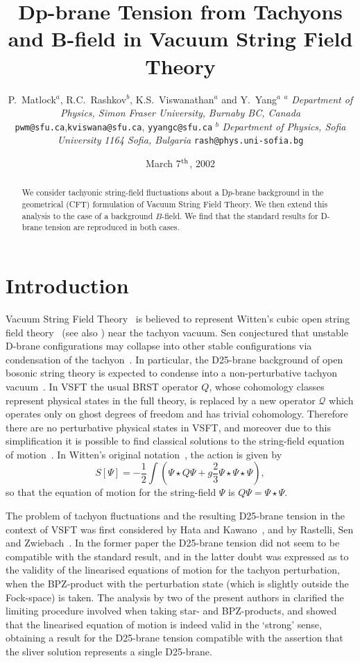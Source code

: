 \documentclass[letterpaper,12pt]{article}
\title{Dp-brane Tension from Tachyons and B-field in Vacuum String Field Theory}
\author{P.~Matlock$^a$, R.C.~Rashkov$^b$, K.S.~Viswanathan$^a$ and Y.~Yang$^a$ \cr\cr
     ${}^a$ \small \emph{Department of Physics, Simon Fraser University,}\cr
            \small \emph{Burnaby BC, Canada}\cr 
            \small \texttt{pwm@sfu.ca},\quad \texttt{kviswana@sfu.ca},
            \quad \texttt{yyangc@sfu.ca}\cr 
     ${}^b$ \small \emph{Department of Physics, Sofia University}\cr
            \small \emph{1164 Sofia, Bulgaria}\cr
            \small \texttt{rash@phys.uni-sofia.bg} }
\date{March 7$^{\textup{th}}$, 2002}
\def\Pcm#1{{\mathcal{#1}}}
\begin{document}
 
\maketitle 
\begin{abstract}
  We consider tachyonic string-field fluctuations about a 
D$p$-brane background in the geometrical (CFT) formulation 
of Vacuum String Field Theory. We then extend this analysis
to the case of a background $B$-field. We find that the standard
results for D-brane tension are reproduced in both cases.
\end{abstract}
\newpage
\section{Introduction}
 Vacuum String Field Theory~\cite{RSZ5} is believed to represent Witten's cubic open 
string field theory~\cite{Witten1} (see also \cite{GJ1,GJ2,KP,GT1,GT2}) near the tachyon vacuum.
Sen conjectured that unstable D-brane configurations may collapse into other
stable configurations via condensation of the tachyon~\cite{Sen,Sen2}. In particular, the
D25-brane background of open bosonic string theory is expected to condense into a
non-perturbative tachyon vacuum~\cite{RZ,RSZ1}.
In VSFT the usual BRST operator $Q$, whose cohomology classes represent physical 
states in the
full theory, is replaced by a new operator $\Pcm{Q}$ which operates only on ghost degrees of freedom
and has trivial cohomology. Therefore there are no perturbative physical states in 
VSFT, and moreover due to this simplification it is possible to find classical solutions 
to the string-field equation of motion~\cite{KP,GT1,RSZ2,RSZ5}. 
In Witten's original notation~\cite{Witten1}, the action is given by
\[S[\Psi]=-\frac12\int\left(\Psi\star Q \Psi +g\frac23 \Psi\star\Psi\star\Psi \right),\]
so that the equation of motion for the string-field $\Psi$ is $Q\Psi=\Psi \star \Psi$.

 The problem of tachyon fluctuations and the resulting D25-brane tension in the context of VSFT 
was first considered by Hata and Kawano~\cite{HK}, and by Rastelli, Sen and Zwiebach~\cite{RSZ6}.
In the former paper the D25-brane tension did not seem to be compatible with the standard result,
and in the latter doubt was expressed as to the validity of the linearised equations 
of motion for the tachyon perturbation, when the BPZ-product with the perturbation state (which is
slightly outside the Fock-space) is taken. The analysis by two of the present authors in \cite{RV}
clarified the limiting procedure involved when taking star- and BPZ-products, and showed 
that the linearised equation of motion is indeed valid in the `strong' sense, obtaining a result
for the D25-brane tension compatible with the assertion that the sliver solution represents 
a single D25-brane.
\end{document}
